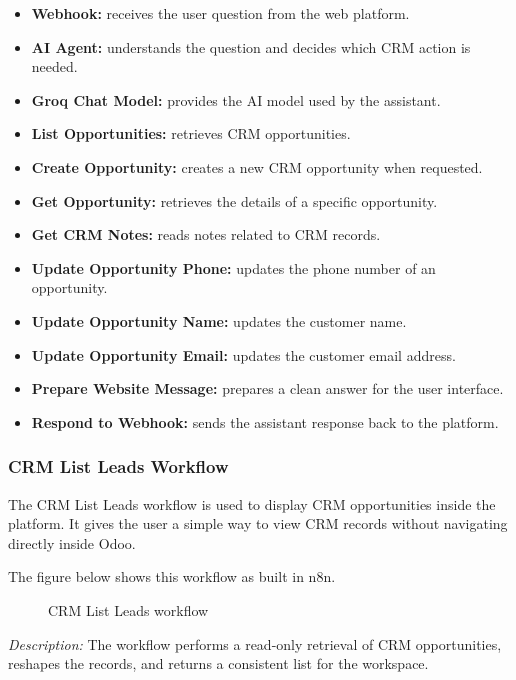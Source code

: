 \documentclass[12pt,a4paper,oneside]{report}
\newcommand{\figdesc}[1]{%
\vspace{-0.05cm}\noindent\small\textit{Description:} #1\par\normalsize\vspace{0.30cm}%
}
\begin{document}
\begin{itemize}
\item \textbf{Webhook:} receives the user question from the web platform.
\item \textbf{AI Agent:} understands the question and decides which CRM action is needed.
\item \textbf{Groq Chat Model:} provides the AI model used by the assistant.
\item \textbf{List Opportunities:} retrieves CRM opportunities.
\item \textbf{Create Opportunity:} creates a new CRM opportunity when requested.
\item \textbf{Get Opportunity:} retrieves the details of a specific opportunity.
\item \textbf{Get CRM Notes:} reads notes related to CRM records.
\item \textbf{Update Opportunity Phone:} updates the phone number of an opportunity.
\item \textbf{Update Opportunity Name:} updates the customer name.
\item \textbf{Update Opportunity Email:} updates the customer email address.
\item \textbf{Prepare Website Message:} prepares a clean answer for the user interface.
\item \textbf{Respond to Webhook:} sends the assistant response back to the platform.
\end{itemize}

\subsubsection{CRM List Leads Workflow}

The CRM List Leads workflow is used to display CRM opportunities inside the platform. It gives the user a simple way to view CRM records without navigating directly inside Odoo.

The figure below shows this workflow as built in n8n.

\begin{figure}[H]
\centering
{}
\caption{CRM List Leads workflow}
\label{fig:crm list leads workflow}
\end{figure}
\figdesc{The workflow performs a read-only retrieval of CRM opportunities, reshapes the records, and returns a consistent list for the workspace.}
\end{document}
